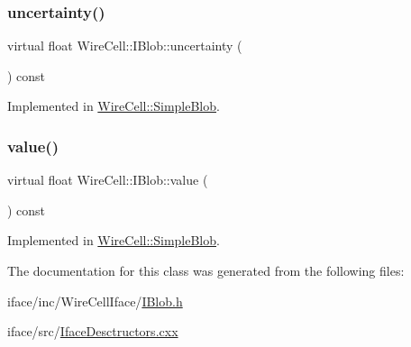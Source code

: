 \subsubsection{\texorpdfstring{uncertainty()}{uncertainty()}}
{\footnotesize\ttfamily virtual float Wire\+Cell\+::\+I\+Blob\+::uncertainty (\begin{DoxyParamCaption}{ }\end{DoxyParamCaption}) const\hspace{0.3cm}{\ttfamily [pure virtual]}}



Implemented in \hyperlink{class_wire_cell_1_1_simple_blob_a011fc52f38b039df8212e517760d3340}{Wire\+Cell\+::\+Simple\+Blob}.

\mbox{\label{class_wire_cell_1_1_i_blob_a3ce475d8fcd507ee6ffa0237db4d6c80}} 
\subsubsection{\texorpdfstring{value()}{value()}}
{\footnotesize\ttfamily virtual float Wire\+Cell\+::\+I\+Blob\+::value (\begin{DoxyParamCaption}{ }\end{DoxyParamCaption}) const\hspace{0.3cm}{\ttfamily [pure virtual]}}



Implemented in \hyperlink{class_wire_cell_1_1_simple_blob_ad4e01188fcc5814783beca0895c814b3}{Wire\+Cell\+::\+Simple\+Blob}.



The documentation for this class was generated from the following files\+:\begin{DoxyCompactItemize}
\item 
iface/inc/\+Wire\+Cell\+Iface/\hyperlink{_i_blob_8h}{I\+Blob.\+h}\item 
iface/src/\hyperlink{_iface_desctructors_8cxx}{Iface\+Desctructors.\+cxx}\end{DoxyCompactItemize}
